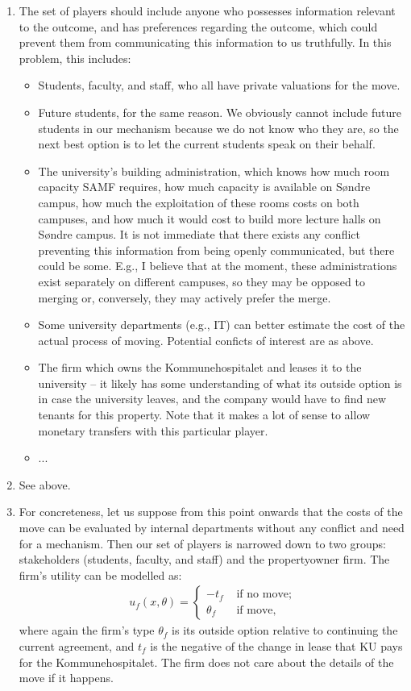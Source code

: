 \documentclass[a4paper]{article}
\begin{document}
\begin{enumerate}
	\item The set of players should include anyone who possesses information relevant to the outcome, and has preferences regarding the outcome, which could prevent them from communicating this information to us truthfully. In this problem, this includes:
	\begin{itemize}[noitemsep]
		\item Students, faculty, and staff, who all have private valuations for the move.
		\item Future students, for the same reason. We obviously cannot include future students in our mechanism because we do not know who they are, so the next best option is to let the current students speak on their behalf.
		\item The university's building administration, which knows how much room capacity SAMF requires, how much capacity is available on S{\o}ndre campus, how much the exploitation of these rooms costs on both campuses, and how much it would cost to build more lecture halls on S{\o}ndre campus. It is not immediate that there exists any conflict preventing this information from being openly communicated, but there could be some. E.g., I believe that at the moment, these administrations exist separately on different campuses, so they may be opposed to merging or, conversely, they may actively prefer the merge.
		\item Some university departments (e.g., IT) can better estimate the cost of the actual process of moving. Potential conficts of interest are as above.
		\item The firm which owns the Kommunehospitalet and leases it to the university -- it likely has some understanding of what its outside option is in case the university leaves, and the company would have to find new tenants for this property. Note that it makes a lot of sense to allow monetary transfers with this particular player.
		\item ...
	\end{itemize}
	
	\item See above.
	
	\item For concreteness, let us suppose from this point onwards that the costs of the move can be evaluated by internal departments without any conflict and need for a mechanism. Then our set of players is narrowed down to two groups: stakeholders (students, faculty, and staff) and the propertyowner firm. The firm's utility can be modelled as:
	\begin{align*}
		u_f(x,\theta) = \begin{cases}
			-t_f & \text{ if no move};
			\\
			\theta_f & \text{ if move},
		\end{cases}
	\end{align*}
	where again the firm's type $\theta_f$ is its outside option relative to continuing the current agreement, and $t_f$ is the negative of the change in lease that KU pays for the Kommunehospitalet. The firm does not care about the details of the move if it happens.
	

\end{enumerate}
\end{document}
